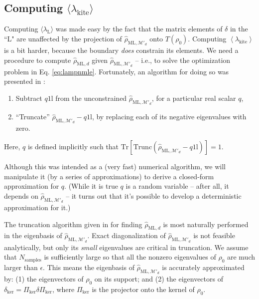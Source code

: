 \documentclass[aps,pra, twocolumn]{revtex4-1}
\newcommand{\M}{\mathcal{M}}
\newcommand{\Tr}{\mathrm{Tr}}
\newcommand{\Id}{\mathbb{I}}
\newcommand{\expect}[1]{\ensuremath{\left\langle#1\right\rangle}}
\def\Id{1\!\mathrm{l}}
\newcommand{\rhohat}{\hat{\rho}}
\newcommand{\rhoML}[1]{\rhohat_{\scriptscriptstyle{\mathrm{ML},#1}}}
\begin{document}
\subsection{Computing $\langle \lambda_\mathrm{kite}\rangle$}
\label{subsec:kite}
Computing $\langle \lambda_{\mathrm{L}}\rangle$ was made easy by the fact that the matrix elements of $\delta$ in the ``L" are unaffected by the projection of $\rhoML{\M'_{d}}$ onto $T(\rho_{0})$. Computing $\expect{\lambda_{\mathrm{kite}}}$ is a bit harder, because the boundary \emph{does} constrain its elements. We need a procedure to compute $\rhoML{d}$ given $\rhoML{\M'_{d}}$ -- i.e., to solve the optimization problem in Eq. \eqref{eq:lampnmle}.  Fortunately, an algorithm for doing so was presented in \cite{Smolin2012}:
\begin{enumerate}[noitemsep]
\item Subtract $q\Id$ from the unconstrained $\rhoML{\M'_{d}}$, for a particular real scalar $q$,
\item ``Truncate'' $\rhoML{\M'_{d}}-q\Id$, by replacing each of its negative eigenvalues with zero.
\end{enumerate}
Here, $q$ is defined implicitly such that $\Tr\left[ \mathrm{Trunc}(\rhoML{\M'_{d}}-q\Id)\right] = 1$.

Although this was intended as a (very fast) numerical algorithm, we will manipulate it (by a series of approximations) to derive a closed-form approximation for $q$. (While it is true $q$ is a random variable -- after all, it depends on $\rhoML{\M'_{d}}$ -- it turns out that it's possible to develop a deterministic approximation for it.)

The truncation algorithm given in \cite{Smolin2012} for finding $\rhoML{d}$ is most naturally performed in the eigenbasis of $\rhoML{\M'_{d}}$.  Exact diagonalization of $\rhoML{\M'_{d}}$ is not feasible analytically, but only its \emph{small} eigenvalues are critical in truncation.  We assume that $N_{\mathrm{samples}}$ is sufficiently large so that all the nonzero eigenvalues of $\rho_0$ are much larger than $\epsilon$. This means the eigenbasis of $\rhoML{\M'_{d}}$ is accurately approximated by: (1) 
the eigenvectors of $\rho_0$ on its support; and (2) the eigenvectors of $\delta_{\mathrm{ker}} = \Pi_{\mathrm{ker}}\delta\Pi_{\mathrm{ker}}$, where $\Pi_{\mathrm{ker}}
$ is the projector onto the kernel of $\rho_0$.
\end{document}
